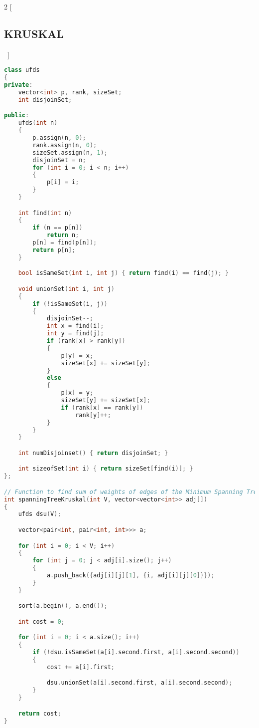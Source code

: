 \documentclass[leter]{amsart}
\begin{document}
\begin{multicols}{2}
[\subsection{KRUSKAL}\ ]
\begin{lstlisting}[language=C++]
class ufds
{
private:
    vector<int> p, rank, sizeSet;
    int disjoinSet;

public:
    ufds(int n)
    {
        p.assign(n, 0);
        rank.assign(n, 0);
        sizeSet.assign(n, 1);
        disjoinSet = n;
        for (int i = 0; i < n; i++)
        {
            p[i] = i;
        }
    }

    int find(int n)
    {
        if (n == p[n])
            return n;
        p[n] = find(p[n]);
        return p[n];
    }

    bool isSameSet(int i, int j) { return find(i) == find(j); }

    void unionSet(int i, int j)
    {
        if (!isSameSet(i, j))
        {
            disjoinSet--;
            int x = find(i);
            int y = find(j);
            if (rank[x] > rank[y])
            {
                p[y] = x;
                sizeSet[x] += sizeSet[y];
            }
            else
            {
                p[x] = y;
                sizeSet[y] += sizeSet[x];
                if (rank[x] == rank[y])
                    rank[y]++;
            }
        }
    }

    int numDisjoinset() { return disjoinSet; }

    int sizeofSet(int i) { return sizeSet[find(i)]; }
};

// Function to find sum of weights of edges of the Minimum Spanning Tree.
int spanningTreeKruskal(int V, vector<vector<int>> adj[])
{
    ufds dsu(V);

    vector<pair<int, pair<int, int>>> a;

    for (int i = 0; i < V; i++)
    {
        for (int j = 0; j < adj[i].size(); j++)
        {
            a.push_back({adj[i][j][1], {i, adj[i][j][0]}});
        }
    }

    sort(a.begin(), a.end());

    int cost = 0;

    for (int i = 0; i < a.size(); i++)
    {
        if (!dsu.isSameSet(a[i].second.first, a[i].second.second))
        {
            cost += a[i].first;

            dsu.unionSet(a[i].second.first, a[i].second.second);
        }
    }

    return cost;
}

\end{lstlisting}
\end{multicols}
\end{document}
